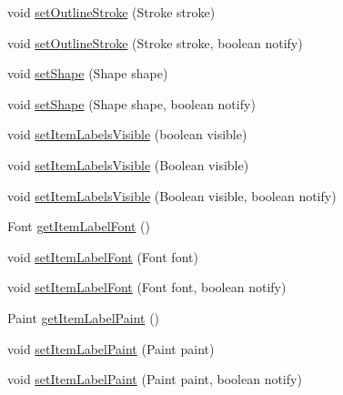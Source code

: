 \begin{DoxyCompactItemize}
\item 
void \mbox{\hyperlink{classorg_1_1jfree_1_1chart_1_1renderer_1_1_abstract_renderer_a42996d497d13da2046b961fe6b5eedbb}{set\+Outline\+Stroke}} (Stroke stroke)
\item 
void \mbox{\hyperlink{classorg_1_1jfree_1_1chart_1_1renderer_1_1_abstract_renderer_a4f54e760f281e2643ebab8f182214212}{set\+Outline\+Stroke}} (Stroke stroke, boolean notify)
\item 
void \mbox{\hyperlink{classorg_1_1jfree_1_1chart_1_1renderer_1_1_abstract_renderer_a21366bf2996bed80af19ed88a66cc11f}{set\+Shape}} (Shape shape)
\item 
void \mbox{\hyperlink{classorg_1_1jfree_1_1chart_1_1renderer_1_1_abstract_renderer_ae5e444ff4c8373ed2f612f7c16db10b7}{set\+Shape}} (Shape shape, boolean notify)
\item 
void \mbox{\hyperlink{classorg_1_1jfree_1_1chart_1_1renderer_1_1_abstract_renderer_abc3441569a05e9f2d2cbdd6744e820a9}{set\+Item\+Labels\+Visible}} (boolean visible)
\item 
void \mbox{\hyperlink{classorg_1_1jfree_1_1chart_1_1renderer_1_1_abstract_renderer_a7c4b0f5905455a8e7271bf87a6ccbb7f}{set\+Item\+Labels\+Visible}} (Boolean visible)
\item 
void \mbox{\hyperlink{classorg_1_1jfree_1_1chart_1_1renderer_1_1_abstract_renderer_a6946afbd4d7476711bd5c502a99cc9cc}{set\+Item\+Labels\+Visible}} (Boolean visible, boolean notify)
\item 
Font \mbox{\hyperlink{classorg_1_1jfree_1_1chart_1_1renderer_1_1_abstract_renderer_a41446f3d3514335858bfb60e72b53e26}{get\+Item\+Label\+Font}} ()
\item 
void \mbox{\hyperlink{classorg_1_1jfree_1_1chart_1_1renderer_1_1_abstract_renderer_a70aac956bd7c7c1907639e13bb845b37}{set\+Item\+Label\+Font}} (Font font)
\item 
void \mbox{\hyperlink{classorg_1_1jfree_1_1chart_1_1renderer_1_1_abstract_renderer_a194db5ef303c821d5d902bdb04ad640e}{set\+Item\+Label\+Font}} (Font font, boolean notify)
\item 
Paint \mbox{\hyperlink{classorg_1_1jfree_1_1chart_1_1renderer_1_1_abstract_renderer_aa8e42806df8a95921d2e593462d1e758}{get\+Item\+Label\+Paint}} ()
\item 
void \mbox{\hyperlink{classorg_1_1jfree_1_1chart_1_1renderer_1_1_abstract_renderer_a03723d65857f761a3f36c0af8db9b2f4}{set\+Item\+Label\+Paint}} (Paint paint)
\item 
void \mbox{\hyperlink{classorg_1_1jfree_1_1chart_1_1renderer_1_1_abstract_renderer_aa6fcfaba6ff79ab8e49ed761b1bd059d}{set\+Item\+Label\+Paint}} (Paint paint, boolean notify)

\end{DoxyCompactItemize}
